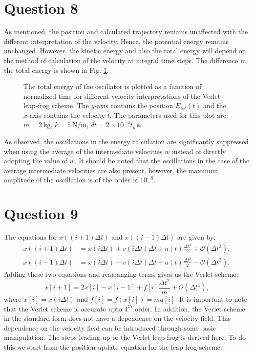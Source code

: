 \documentclass[10pt]{article}
\begin{document}
\section*{Question 8}
As mentioned, the position and calculated trajectory remains unaffected with the different interpretation of the velocity. Hence, the potential energy remains unchanged. However, the kinetic energy and also the total energy will depend on the method of calculation of the velocity at integral time steps. The difference in the total energy is shown in Fig. \ref{fig:verletLF_dt_compare_intermediate_velocities}. 

\begin{figure}[!htb]
\centering

\caption{The total energy of the oscillator is plotted as a function of normalized time for different velocity interpretations of the Verlet leap-frog scheme. The $y$-axis contains the position $E_{tot}(t)$ and the $x$-axis contains the velocity $\tilde{t}$. The parameters used for this plot are: $m=2\ \mathrm{kg}$, $k=5\ \mathrm{N/m}$, $dt=2\times 10^{-4}t_{p}\ \mathrm{s}$.}
\label{fig:verletLF_dt_compare_intermediate_velocities}
\end{figure}

As observed, the oscillations in the energy calculation are significantly suppressed when using the average of the intermediate velocities $w$ instead of directly adopting the value of $w$. It should be noted that the oscillations in the case of the average intermediate velocities are also present, however, the maximum amplitude of the oscillation is of the order of $10^{-6}$. 

\section*{Question 9}
The equations for $x((i+1)\Delta t)$ and $x((i-1)\Delta t)$ are given by:
%
\begin{eqnarray}
x((i+1)\Delta t) &= x(i\Delta t) + v(i\Delta t) \Delta t + a(t) \frac{\Delta t^2}{2} + \mathcal{O}(\Delta t^3), \\
x((i-1)\Delta t) &= x(i\Delta t) - v(i\Delta t) \Delta t + a(t) \frac{\Delta t^2}{2} - \mathcal{O}(\Delta t^3).
\end{eqnarray}
%
Adding these two equations and rearranging terms gives us the Verlet scheme:
\begin{equation}
\boxed{x[i+1] = 2x[i] - x[i-1] + f[i]\frac{\Delta t^2}{m} + \mathcal{O}(\Delta t^4)},
\end{equation}
%
where $x[i] = x(i\Delta t)$ and $f[i] = f(x[i]) = ma[i]$. It is important to note that the Verlet scheme is accurate upto $4^{th}$ order. In addition, the Verlet scheme in the standard form does not have a dependence on the velocity field. This dependence on the velocity field can be introduced through some basic manipulation. The steps leading up to the Verlet leap-frog is derived here. To do this we start from the position update equation for the leap-frog scheme. 
\end{document}
